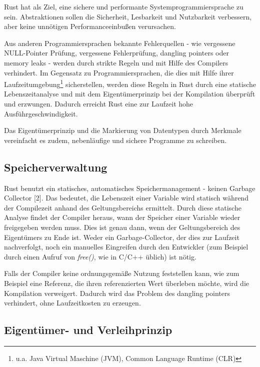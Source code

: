 \begin{multicols}{2}
Rust hat als Ziel, eine sichere und performante Systemprogrammiersprache zu sein.
Abstraktionen sollen die Sicherheit, Lesbarkeit und Nutzbarkeit verbessern, aber keine unnötigen Performanceeinbußen verursachen.

\bildI

Aus anderen Programmiersprachen bekannte Fehlerquellen - wie vergessene NULL-Pointer Prüfung, vergessene Fehlerprüfung, dangling pointers oder memory leaks -  werden durch strikte Regeln und mit Hilfe des Compilers verhindert.
Im Gegensatz zu Programmiersprachen, die dies mit Hilfe ihrer Laufzeitumgebung\footnote{u.a. Java Virtual Maschine (JVM), Common Language Runtime (CLR)} sicherstellen, werden diese Regeln in Rust durch eine statische Lebenszeitanalyse und mit dem Eigentümerprinzip bei der Kompilation überprüft und erzwungen.
Dadurch erreicht Rust eine zur Laufzeit hohe Ausführgeschwindigkeit.

Das Eigentümerprinzip und die Markierung von Datentypen durch Merkmale vereinfacht es zudem, nebenläufige und sichere Programme zu schreiben.


\subsection*{Speicherverwaltung}

Rust benutzt ein statisches, automatisches Speichermanagement - keinen Garbage Collector [2].
Das bedeutet, die Lebenszeit einer Variable wird statisch während der Compilezeit anhand des Geltungsbereichs ermittelt.
Durch diese statische Analyse findet der Compiler heraus, wann der Speicher einer Variable wieder freigegeben werden muss.
Dies ist genau dann, wenn der Geltungsbereich des Eigentümers zu Ende ist.
Weder ein Garbage-Collector, der dies zur Laufzeit nachverfolgt, noch ein manuelles Eingreifen durch den Entwickler (zum Beispiel durch einen Aufruf von \textit{free()}, wie in C/C++ üblich) ist nötig.

Falls der Compiler keine ordnungsgemäße Nutzung feststellen kann, wie zum Beispiel eine Referenz, die ihren referenzierten Wert überleben möchte, wird die Kompilation verweigert.
Dadurch wird das Problem des dangling pointers verhindert, ohne Laufzeitkosten zu erzeugen.

\subsection*{Eigentümer- und Verleihprinzip}


\end{multicols}
